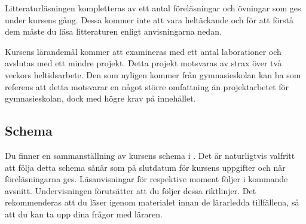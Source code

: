 \documentclass[a4paper,logo]{miunart}
\begin{document}
Litteraturläsningen kompletteras av ett antal föreläsningar och övningar som 
ges under kursens gång.
Dessa kommer inte att vara heltäckande och för att förstå dem måste du läsa 
litteraturen enligt anvisningarna nedan.

Kursens lärandemål kommer att examineras med ett antal laborationer och 
avslutas med ett mindre projekt.
Detta projekt motsvaras av strax över två veckors heltidsarbete.
Den som nyligen kommer från gymnasieskolan kan ha som referens att detta 
motsvarar en något större omfattning än projektarbetet för gymnasieskolan, dock 
med högre krav på innehållet.

\subsection{Schema}
\label{sec:schedule}
Du finner en sammanställning av kursens schema i .
Det är naturligtvis valfritt att följa detta schema sånär som på slutdatum för 
kursens uppgifter och när föreläsningarna ges.
Läsanvisningar för respektive moment följer i kommande avsnitt.
Undervisningen förutsätter att du följer dessa riktlinjer.
Det rekommenderas att du läser igenom materialet innan de lärarledda 
tillfällena, så att du kan ta upp dina frågor med läraren.
\end{document}
